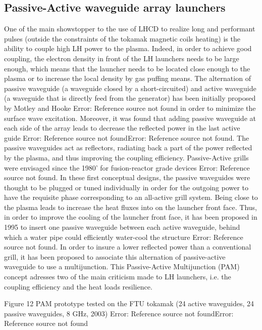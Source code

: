 \subsection{Passive-Active waveguide array launchers}
One of the main showstopper to the use of LHCD to realize long and performant pulses (outside the constraints of the tokamak magnetic coils heating) is the ability to couple high LH power to the plasma. Indeed, in order to achieve good coupling, the electron density in front of the LH launchers needs to be large enough, which means that the launcher needs to be located close enough to the plasma or to increase the local density by gas puffing means. 
The alternation of passive waveguide (a waveguide closed by a short-circuited) and active waveguide (a waveguide that is directly feed from the generator) has been initially proposed by Motley and Hooke Error: Reference source not found in order to minimize the surface wave excitation. Moreover, it was found that adding passive waveguide at each side of the array leads to decrease the reflected power in the last active guide Error: Reference source not foundError: Reference source not found. The passive waveguides act as reflectors, radiating back a part of the power reflected by the plasma, and thus improving the coupling efficiency. Passive-Active grills were envisaged since the 1980' for fusion-reactor grade devices Error: Reference source not found. In these first conceptual designs, the passive waveguides were thought to be plugged or tuned individually in order for the outgoing power to have the requisite phase corresponding to an all-active grill system. 
Being close to the plasma leads to increase the heat fluxes into on the launcher front face. Thus, in order to improve the cooling of the launcher front face, it has been proposed in 1995 to insert one passive waveguide between each active waveguide, behind which a water pipe could efficiently water-cool the structure Error: Reference source not found. 
In order to insure a lower reflected power than a conventional grill, it has been proposed to associate this alternation of passive-active waveguide to  use a multijunction. This Passive-Active Multijunction (PAM) concept adresses two of the main criticism made to LH launchers, i.e. the coupling efficiency and the heat loads resilience. 

Figure 12 PAM prototype tested on the FTU tokamak (24 active waveguides, 24 passive waveguides, 8 GHz, 2003) Error: Reference source not foundError: Reference source not found


